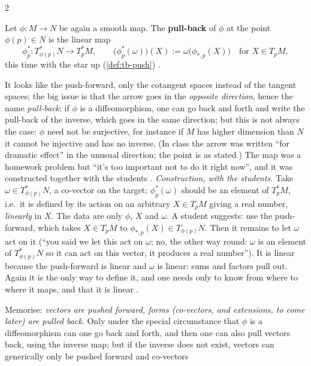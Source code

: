 \begin{paracol}{2}
\begin{definition}\label{def:tb-pull}
Let $\phi\colon M\to N$ be again a smooth map. The \textbf{pull-back} of $\phi$ at the point $\phi(p)\in N$ is the linear map
\[
  \phi^{*}_{p}\colon T^*_{\phi(p)}N\longrightarrow T^*_pM,\qquad\bigl(\phi^*_p(\omega)\bigr)(X):=\omega\bigl(\phi_{*,p}(X)\bigr)\quad\text{for }X\in T_pM,
\]
this time with the star up (\cref{def:tb-push})      .
\end{definition}
It looks like the push-forward, only the cotangent spaces instead of the tangent spaces; the big issue is that the arrow goes in the \emph{opposite direction}, hence the name \emph{pull-back}: if $\phi$ is a diffeomorphism, one can go back and forth and write the pull-back of the inverse, which goes in the same direction; but this is not always the case: $\phi$
need not be surjective, for instance if $M$ has higher dimension than $N$ it cannot be injective and has no inverse. (In class the arrow was written ``for dramatic effect'' in the unusual direction; the point is as stated.) The map was a homework problem but ``it's too important not to do it right now'', and it was constructed together with the students
   .
\emph{Construction, with the students.} Take $\omega\in T^*_{\phi(p)}N$, a co-vector on the target; $\phi^*_p(\omega)$ should be an element of $T^*_pM$, i.e.\ it is defined by its action on an arbitrary $X\in T_pM$ giving a real number, \emph{linearly} in $X$. The data are only $\phi$, $X$ and $\omega$. A student suggests: use the push-forward, which takes
$X\in T_pM$ to $\phi_{*,p}(X)\in T_{\phi(p)}N$. Then it remains to let $\omega$ act on it (``you said we let this act on $\omega$; no, the other way round: $\omega$ is an element of $T^*_{\phi(p)}N$ so it can act on this vector, it produces a real number''). It is linear because the push-forward is linear and $\omega$ is linear: sums and factors
pull out. Again it is the only way to define it, and one needs only to know from where to where it maps, and that it is linear      .
\begin{intuition}\label{int:tb-motto}
Memorise: \emph{vectors are pushed forward, forms (co-vectors, and extensions, to come later) are pulled back}. Only under the special circumstance that $\phi$ is a diffeomorphism can one go back and forth, and then one can also pull vectors back, using the inverse map; but if the inverse does not exist, vectors can generically only be pushed forward and co-vectors

\end{intuition}
\end{paracol}
